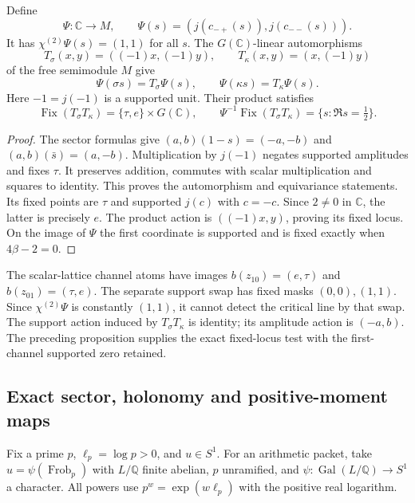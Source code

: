 \begin{proposition}
\label{prop:sz-critical-fixed-locus}
Define
\[
\Psi:\mathbb C\to M,\qquad\Psi(s)=(j(c_{-+}(s)),j(c_{--}(s))).
\]
It has $\chi^{(2)}\Psi(s)=(1,1)$ for all $s$. The $G(\mathbb C)$-linear automorphisms
\[
T_\sigma(x,y)=((-1)x,(-1)y),\qquad T_\kappa(x,y)=(x,(-1)y)
\]
of the free semimodule $M$ give
\[
\Psi(\sigma s)=T_\sigma\Psi(s),\qquad\Psi(\kappa s)=T_\kappa\Psi(s).
\]
Here $-1=j(-1)$ is a supported unit. Their product satisfies
\[
\operatorname{Fix}(T_\sigma T_\kappa)=\{\tau,e\}\times G(\mathbb C),\qquad
\Psi^{-1}\operatorname{Fix}(T_\sigma T_\kappa)=\{s:\Re s=\tfrac12\}.
\]
\end{proposition}
\begin{proof}
The sector formulas give $(a,b)(1-s)=(-a,-b)$ and $(a,b)(\bar s)=(a,-b)$. Multiplication by $j(-1)$ negates supported amplitudes and fixes $\tau$. It preserves addition, commutes with scalar multiplication and squares to identity. This proves the automorphism and equivariance statements. Its fixed points are $\tau$ and supported $j(c)$ with $c=-c$. Since $2\ne0$ in $\mathbb C$, the latter is precisely $e$. The product action is $((-1)x,y)$, proving its fixed locus. On the image of $\Psi$ the first coordinate is supported and is fixed exactly when $4\beta-2=0$.
\end{proof}

The scalar-lattice channel atoms have images $b(z_{10})=(e,\tau)$ and $b(z_{01})=(\tau,e)$. The separate support swap has fixed masks $(0,0),(1,1)$. Since $\chi^{(2)}\Psi$ is constantly $(1,1)$, it cannot detect the critical line by that swap. The support action induced by $T_\sigma T_\kappa$ is identity; its amplitude action is $(-a,b)$. The preceding proposition supplies the exact fixed-locus test with the first-channel supported zero retained.

\subsection{Exact sector, holonomy and positive-moment maps}

Fix a prime $p$, $\ell_p=\log p>0$, and $u\in S^1$. For an arithmetic packet, take $u=\psi(\operatorname{Frob}_p)$ with $L/\mathbb Q$ finite abelian, $p$ unramified, and $\psi:\operatorname{Gal}(L/\mathbb Q)\to S^1$ a character. All powers use $p^w=\exp(w\ell_p)$ with the positive real logarithm.

